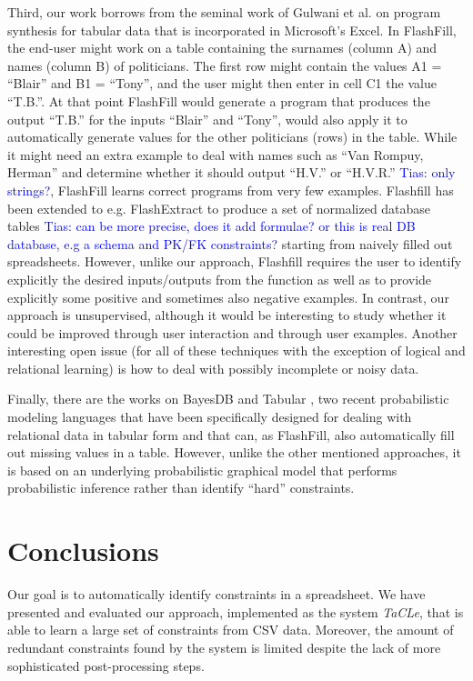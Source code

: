 \documentclass{IEEEtran}
\newcommand{\tias}[1]{\textcolor{blue}{{\sc Tias:} #1}\xspace}
\newcommand{\format}[1]{\textit{#1}\xspace}
\newcommand{\sname}{\format{TaCLe}}
\theoremstyle{definition}
\begin{document}
Third, our work borrows from the seminal work of Gulwani et al. \cite{flashfill} on program synthesis for tabular data that is incorporated in Microsoft’s Excel. In FlashFill, the end-user might work on a table containing the surnames (column A) and names (column B) of politicians. The first row might contain the values A1 = ``Blair'' and B1 = ``Tony'', and the user might then enter in cell C1 the value ``T.B.''. At that point FlashFill would generate a program that produces the output ``T.B.'' for the inputs ``Blair'' and ``Tony'', would also apply it to automatically generate values for the other politicians (rows) in the table. While it might need an extra example to deal with names such as ``Van Rompuy, Herman'' and determine whether it should output ``H.V.'' or ``H.V.R.'' \tias{only strings?}, FlashFill learns correct programs from very few examples. Flashfill has been extended to e.g. FlashExtract \cite{flashextract} to produce a set of normalized database tables \tias{can be more precise, does it add formulae? or this is real DB database, e.g a schema and PK/FK constraints?} starting from naively filled out spreadsheets. However, unlike our approach, Flashfill requires the user to identify explicitly the desired inputs/outputs from the function as well as to provide explicitly some positive and sometimes also negative examples.  In contrast, our approach is unsupervised, although it would be interesting to study whether it could be improved through user interaction and through user examples.  Another interesting open issue (for all of these techniques with the exception of logical and relational learning) is how to deal with possibly incomplete or noisy data.

Finally, there are the works on  BayesDB \cite{BayesDB} and Tabular \cite{tabular}, two recent probabilistic modeling languages that have been specifically designed for dealing with relational data in tabular form and that can, as FlashFill, also automatically fill out missing values in a table.  However, unlike the other mentioned approaches, it is based on an underlying probabilistic graphical model that performs probabilistic inference rather than identify “hard” constraints.

\section{Conclusions}\label{sec:conclusions}

Our goal is to automatically identify constraints in a spreadsheet.
We have presented and evaluated our approach, implemented as the system \sname, that is able to learn a large set of constraints from CSV data.
Moreover, the amount of redundant constraints found by the system is limited despite the lack of more sophisticated post-processing steps.
\end{document}
